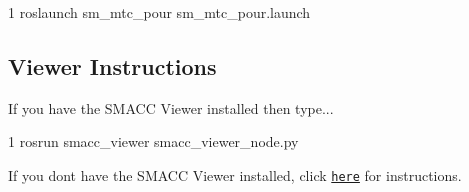 \begin{DoxyCode}
1 roslaunch sm\_mtc\_pour sm\_mtc\_pour.launch
\end{DoxyCode}


\subsection*{Viewer Instructions}

If you have the S\+M\+A\+CC Viewer installed then type...


\begin{DoxyCode}
1 rosrun smacc\_viewer smacc\_viewer\_node.py
\end{DoxyCode}


If you don\textquotesingle{}t have the S\+M\+A\+CC Viewer installed, click \href{http://smacc.ninja/smacc-viewer/}{\tt here} for instructions. 
